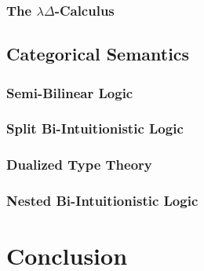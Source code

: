 
\subsubsection{The $\lambda\Delta$-Calculus}
\label{subsec:the_lambdadelta-calculus}



\subsection{Categorical Semantics}
\label{subsec:categorical_semantics}
\subsubsection{Semi-Bilinear Logic}
\label{subsec:semi-bilinear_logic}


\subsubsection{Split Bi-Intuitionistic Logic}
\label{subsec:split_bi-intuitionistic_logic}


\subsubsection{Dualized Type Theory}
\label{subsubsec:dualized_type_theory}


\subsubsection{Nested Bi-Intuitionistic Logic}
\label{subsec:nested_bi-intuitionistic_logic}



 
\section{Conclusion}
\label{sec:conclusion}


 

